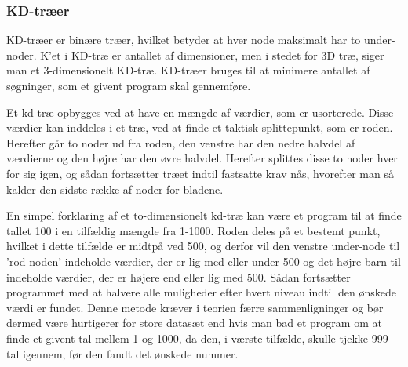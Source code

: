 \subsubsection{KD-træer}
\label{sec:kdtree}

KD-træer er binære træer, hvilket betyder at hver node maksimalt har to under-noder. K'et i KD-træ er antallet af dimensioner, men i stedet for 3D træ, siger man et 3-dimensionelt KD-træ. KD-træer bruges til at minimere antallet af søgninger, som et givent program skal gennemføre. 

Et kd-træ opbygges ved at have en mængde af værdier, som er usorterede. Disse værdier kan inddeles i et træ, ved at finde et taktisk splittepunkt, som er roden. Herefter går to noder ud fra roden, den venstre har den nedre halvdel af værdierne og den højre har den øvre halvdel. Herefter splittes disse to noder hver for sig igen, og sådan fortsætter træet indtil fastsatte krav nås, hvorefter man så kalder den sidste række af noder for bladene. 

En simpel forklaring af et to-dimensionelt kd-træ kan være et program til at finde tallet 100 i en tilfældig mængde fra 1-1000. Roden deles på et bestemt punkt, hvilket i dette tilfælde er midtpå ved 500, og derfor vil den venstre under-node til 'rod-noden' indeholde værdier, der er lig med eller under 500 og det højre barn til indeholde værdier, der er højere end eller lig med 500. Sådan fortsætter programmet med at halvere alle muligheder efter hvert niveau indtil den ønskede værdi er fundet. Denne metode kræver i teorien færre sammenligninger og bør dermed være hurtigerer for store datasæt end hvis man bad et program om at finde et givent tal mellem 1 og 1000, da den, i værste tilfælde, skulle tjekke 999 tal igennem, før den fandt det ønskede nummer.